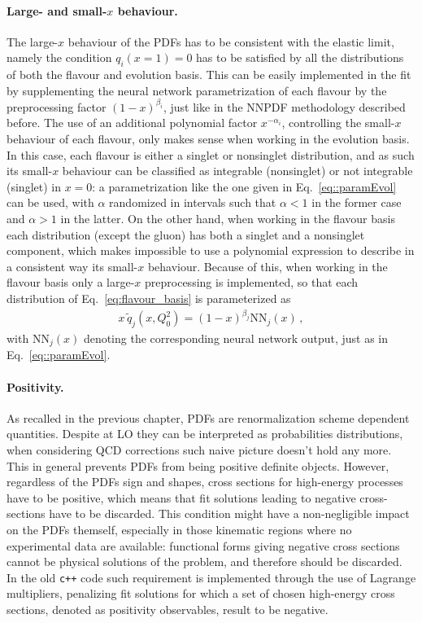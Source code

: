 \paragraph{Large- and small-$x$ behaviour.} 
The large-$x$ behaviour of the PDFs has to be consistent with the elastic limit, namely the condition
$q_i\left(x=1\right)=0$ has to be satisfied by all the distributions of both the flavour and evolution basis.
This can be easily implemented in the fit by supplementing the neural network parametrization of 
each flavour by the preprocessing factor $\left(1-x\right)^{\beta_i}$, just like in the NNPDF methodology
described before.
The use of an additional polynomial factor $x^{-\alpha_i}$, controlling the small-$x$ behaviour of each flavour,
only makes sense when working in the evolution basis. In this case, each flavour is either a singlet or nonsinglet
distribution, and as such its small-$x$ behaviour can be classified as integrable (nonsinglet) or not integrable (singlet)
in $x=0$: a parametrization like the one given in Eq.~\eqref{eq::paramEvol} can be used, with $\alpha$
randomized in intervals such that $\alpha<1$ in the former case and $\alpha>1$ in the latter.
%
On the other hand, when working in the flavour basis each distribution (except the gluon) has both a singlet 
and a nonsinglet component, which makes impossible to use a polynomial expression 
to describe in a consistent way its small-$x$ behaviour. Because of this, when working in the flavour basis
only a large-$x$ preprocessing is implemented, so that each distribution of Eq.~\eqref{eq:flavour_basis} is
parameterized as
\begin{align}
    x\,\tilde{q}_j\left(x, Q_0^2\right) = \left(1-x\right)^{\beta_{j}}\text{NN}_{j}\left(x\right)\,,
\end{align}
with $\text{NN}_{j}\left(x\right)$ denoting the corresponding neural network output, just as in Eq.~\eqref{eq::paramEvol}.



\paragraph{Positivity.}
As recalled in the previous chapter, PDFs are renormalization scheme dependent quantities.
Despite at LO they can be interpreted as probabilities distributions, when considering QCD corrections
such naive picture doesn't hold any more. This in general prevents PDFs from being positive definite objects.
However, regardless of the PDFs sign and shapes, cross sections for high-energy processes have to be positive,
which means that fit solutions leading to negative cross-sections have to be discarded.
This condition might have a non-negligible impact on the PDFs themself, 
especially in those kinematic regions where no experimental
data are available: functional forms giving negative cross sections cannot be 
physical solutions of the problem, and therefore should be discarded.  
In the old {\tt c++} code such requirement is implemented through the use of Lagrange multipliers, 
penalizing fit solutions for which a set of chosen high-energy cross sections,
denoted as positivity observables, result to be negative.

